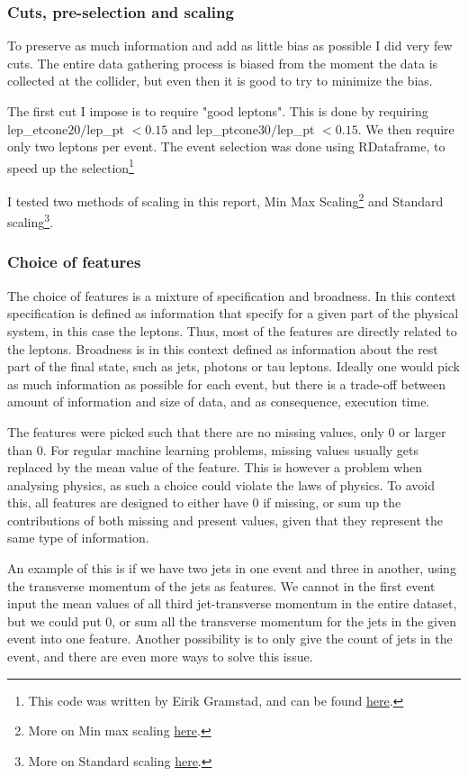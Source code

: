 \documentclass[ reprint, amsmath,amssymb, aps, nofootinbib]{revtex4-2}
\begin{document}
\subsubsection{Cuts, pre-selection and scaling}
To preserve as much information and add as little bias as possible I did very few cuts. The entire data gathering process is biased from the moment the data is collected at the collider, but even then it is good to try to minimize the bias. \par
The first cut I impose is to require "good leptons". This is done by requiring lep\_etcone$20/$lep\_pt $< 0.15$ and lep\_ptcone$30/$lep\_pt $< 0.15$. We then require only two leptons per event. The event selection was done using RDataframe, to speed up the selection\footnote{This code was written by Eirik Gramstad, and can be found \href{https://github.uio.no/zpath/software/blob/eirik-dev/Notebooks/ATLASOpenData/13TeV/RDataFrameToDF.ipynb}{here}.}\par 
I tested two methods of scaling in this report, Min Max Scaling\footnote{More on Min max scaling \href{https://scikit-learn.org/stable/modules/generated/sklearn.preprocessing.MinMaxScaler.html}{here}.} and Standard scaling\footnote{More on Standard scaling \href{https://scikit-learn.org/stable/modules/generated/sklearn.preprocessing.StandardScaler.html}{here}.}\cite{scikit-learn}.

\subsubsection{Choice of features}
The choice of features is a mixture of specification and broadness. In this context specification is defined as information that specify for a given part of the physical system, in this case the leptons. Thus, most of the features are directly related to the leptons. Broadness is in this context defined as information about the rest part of the final state, such as jets, photons or tau leptons. Ideally one would pick as much information as possible for each event, but there is a trade-off between amount of information and size of data, and as consequence, execution time. \par 
The features were picked such that there are no missing values, only 0 or larger than 0. For regular machine learning problems, missing values usually gets replaced by the mean value of the feature. This is however a problem when analysing physics, as such a choice could violate the laws of physics. To avoid this, all features are designed to either have 0 if missing, or sum up the contributions of both missing and present values, given that they represent the same type of information. \par 
An example of this is if we have two jets in one event and three in another, using the transverse momentum of the jets as features. We cannot in the first event input the mean values of all third jet-transverse momentum in the entire dataset, but we could put 0, or sum all the transverse momentum for the jets in the given event into one feature. Another possibility is to only give the count of jets in the event, and there are even more ways to solve this issue. 
\end{document}
